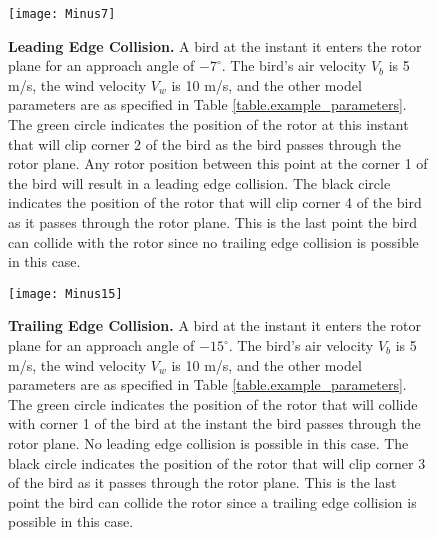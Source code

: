 \documentclass[10pt,conference]{IEEEtran}
\begin{document}
\begin{figure}
   \centering
   \texttt{[image: Minus7]}
   \caption{\textbf{Leading Edge Collision.} A bird at the instant it enters the rotor plane for an approach angle of $-7^\circ$. The bird's air velocity $V_b$ is 5
m/s, the wind velocity $V_w$ is 10 m/s, and the other model parameters are as specified in Table
\ref{table.example_parameters}. The green circle indicates the position of the rotor at this instant that will clip
corner 2 of the bird as the bird passes through the rotor plane. Any rotor position between this point at the corner 1
of the bird will result in a leading edge collision. The black circle indicates the position of the rotor that will
clip corner 4 of the bird as it passes through the rotor plane. This is the last point the bird can collide with the
rotor since no trailing edge collision is possible in this case.}
   \label{fig.Minus7}
   \end{figure}


\begin{figure}
   \centering
   \texttt{[image: Minus15]}
   \caption{\textbf{Trailing Edge Collision.} A bird at the instant it enters the rotor plane for an approach angle of $-15^\circ$. The bird's air velocity $V_b$ is 5
m/s, the wind velocity $V_w$ is 10 m/s, and the other model parameters are as specified in Table
\ref{table.example_parameters}. The green circle indicates the position of the rotor that will collide with corner 1 of
the bird at the instant the bird passes through the rotor plane. No leading edge collision is possible in this case.
The black circle indicates the position of the rotor that will clip corner 3 of the bird as it passes through the rotor
plane. This is the last point the bird can collide the rotor since a trailing edge collision is possible in this case.}
   \label{fig.Minus15}
   \end{figure}
\end{document}
